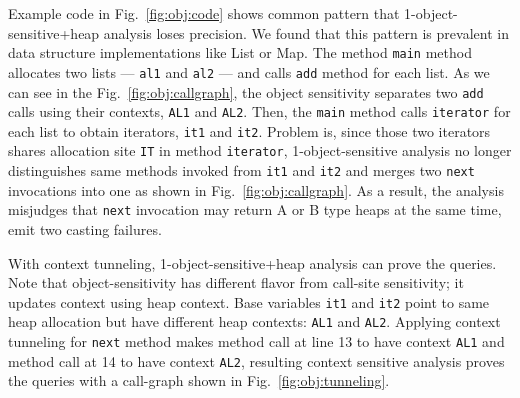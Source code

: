  Example code in
Fig.~\ref{fig:obj:code} shows common pattern that 1-object-sensitive+heap
analysis loses precision. We found that this pattern is prevalent in data
structure implementations like List or Map. The method \texttt{main} method
allocates two lists --- \texttt{al1} and \texttt{al2} --- and calls
\texttt{add} method for each list. As we can see in the
Fig.~\ref{fig:obj:callgraph}, the object sensitivity separates two
\texttt{add} calls using their contexts, \texttt{AL1} and \texttt{AL2}. Then,
the \texttt{main} method calls \texttt{iterator} for each list to obtain
iterators, \texttt{it1} and \texttt{it2}. Problem is, since those two
iterators shares allocation site \texttt{IT} in method \texttt{iterator},
1-object-sensitive analysis no longer distinguishes same methods invoked from
\texttt{it1} and \texttt{it2} and merges two \texttt{next} invocations into
one as shown in Fig.~\ref{fig:obj:callgraph}. As a result, the analysis
misjudges that \texttt{next} invocation may return A or B type heaps at the
same time, emit two casting failures.


 With context
tunneling, 1-object-sensitive+heap analysis can prove the queries. Note that
object-sensitivity has different flavor from call-site sensitivity; it
updates context using heap context. Base variables \texttt{it1} and
\texttt{it2} point to same heap allocation but have different heap contexts:
\texttt{AL1} and \texttt{AL2}. Applying context tunneling for \texttt{next}
method makes method call at line 13 to have context \texttt{AL1} and method
call at 14 to have context \texttt{AL2}, resulting context sensitive analysis
proves the queries with a call-graph shown in Fig.~\ref{fig:obj:tunneling}.



